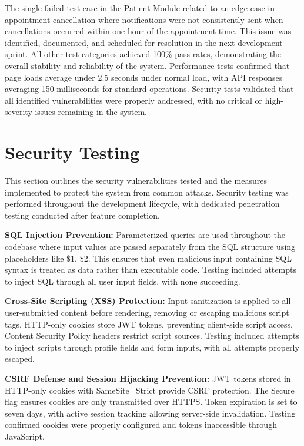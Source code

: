 \justifying
\noindent The single failed test case in the Patient Module related to an edge case in appointment cancellation where notifications were not consistently sent when cancellations occurred within one hour of the appointment time. This issue was identified, documented, and scheduled for resolution in the next development sprint. All other test categories achieved 100\% pass rates, demonstrating the overall stability and reliability of the system. Performance tests confirmed that page loads average under 2.5 seconds under normal load, with API responses averaging 150 milliseconds for standard operations. Security tests validated that all identified vulnerabilities were properly addressed, with no critical or high-severity issues remaining in the system.

\section{Security Testing}

\justifying
\noindent This section outlines the security vulnerabilities tested and the measures implemented to protect the system from common attacks. Security testing was performed throughout the development lifecycle, with dedicated penetration testing conducted after feature completion.

\justifying
\noindent \textbf{SQL Injection Prevention:} Parameterized queries are used throughout the codebase where input values are passed separately from the SQL structure using placeholders like \$1, \$2. This ensures that even malicious input containing SQL syntax is treated as data rather than executable code. Testing included attempts to inject SQL through all user input fields, with none succeeding.

\justifying
\noindent \textbf{Cross-Site Scripting (XSS) Protection:} Input sanitization is applied to all user-submitted content before rendering, removing or escaping malicious script tags. HTTP-only cookies store JWT tokens, preventing client-side script access. Content Security Policy headers restrict script sources. Testing included attempts to inject scripts through profile fields and form inputs, with all attempts properly escaped.

\justifying
\noindent \textbf{CSRF Defense and Session Hijacking Prevention:} JWT tokens stored in HTTP-only cookies with SameSite=Strict provide CSRF protection. The Secure flag ensures cookies are only transmitted over HTTPS. Token expiration is set to seven days, with active session tracking allowing server-side invalidation. Testing confirmed cookies were properly configured and tokens inaccessible through JavaScript.

